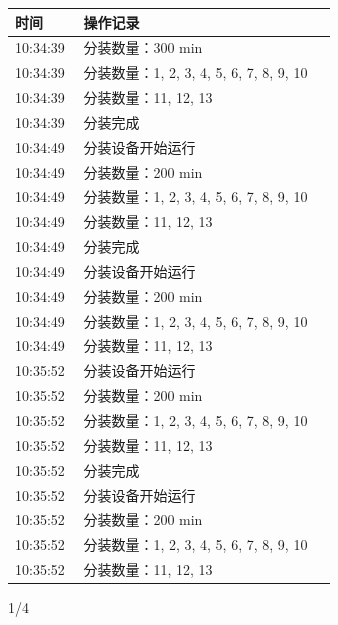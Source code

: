 \documentclass[UTF8,10pt,a4paper,fontset=fandol]{ctexart}
\newcommand{\handwritten}[1]{#1}
\begin{document}
\begin{center}
\begin{minipage}[t]{0.46\linewidth}
\scriptsize
\begin{tabular}{|p{0.20\linewidth}|p{0.74\linewidth}|}
\hline
时间 & 操作记录\\
\hline
10:34:39 & 分装数量：300 min\\
10:34:39 & 分装数量：1, 2, 3, 4, 5, 6, 7, 8, 9, 10\\
10:34:39 & 分装数量：11, 12, 13\\
10:34:39 & 分装完成\\
10:34:49 & 分装设备开始运行\\
10:34:49 & 分装数量：200 min\\
10:34:49 & 分装数量：1, 2, 3, 4, 5, 6, 7, 8, 9, 10\\
10:34:49 & 分装数量：11, 12, 13\\
10:34:49 & 分装完成\\
10:34:49 & 分装设备开始运行\\
10:34:49 & 分装数量：200 min\\
10:34:49 & 分装数量：1, 2, 3, 4, 5, 6, 7, 8, 9, 10\\
10:34:49 & 分装数量：11, 12, 13\\
10:35:52 & 分装设备开始运行\\
10:35:52 & 分装数量：200 min\\
10:35:52 & 分装数量：1, 2, 3, 4, 5, 6, 7, 8, 9, 10\\
10:35:52 & 分装数量：11, 12, 13\\
10:35:52 & 分装完成\\
10:35:52 & 分装设备开始运行\\
10:35:52 & 分装数量：200 min\\
10:35:52 & 分装数量：1, 2, 3, 4, 5, 6, 7, 8, 9, 10\\
10:35:52 & 分装数量：11, 12, 13\\
\hline
\end{tabular}

\vfill
\handwritten{1/4}
\end{minipage}
\end{center}

\newpage
\end{document}
